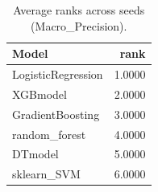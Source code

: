 \begin{table}[t]
\centering
\begin{tabular}{lr}
\toprule
Model & rank \\
\midrule
LogisticRegression & 1.0000 \\
XGBmodel & 2.0000 \\
GradientBoosting & 3.0000 \\
random_forest & 4.0000 \\
DTmodel & 5.0000 \\
sklearn_SVM & 6.0000 \\
\bottomrule
\end{tabular}
\caption{Average ranks across seeds (Macro_Precision).}
\label{tab:avg_rank_Macro_Precision}
\end{table}